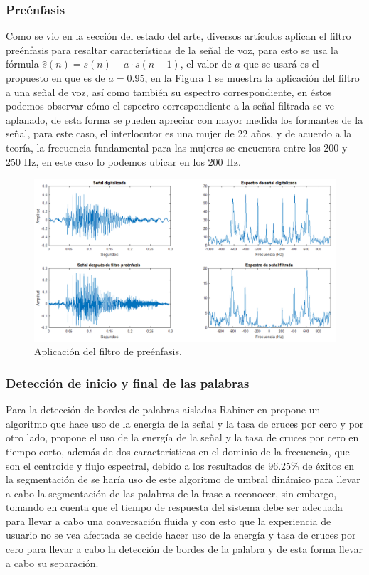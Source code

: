 	\subsubsection*{Preénfasis}
	
	Como se vio en la sección del estado del arte, diversos artículos aplican el filtro preénfasis para resaltar características de la señal de voz, para esto se usa la fórmula $\hat{s}(n)=s(n)-a\cdot s(n-1)$, el valor de $a$ que se usará es el propuesto en \cite{A6} que es de $a=0.95$, en la Figura \ref{fig:ana:preenfasis} se muestra la aplicación del filtro a una señal de voz, así como también su espectro correspondiente, en éstos podemos observar cómo el espectro correspondiente a la señal filtrada se ve aplanado, de esta forma se pueden apreciar con mayor medida los formantes de la señal, para este caso, el interlocutor es una mujer de 22 años, y de acuerdo a la teoría, la frecuencia fundamental para las mujeres se encuentra entre los 200 y 250 Hz, en este caso lo podemos ubicar en los 200 Hz.
	
		\begin{figure}[H]
			\centering
			\includegraphics[width=1\linewidth]{figures/preenfasis}
			\caption{Aplicación del filtro de preénfasis.}
			\label{fig:ana:preenfasis}
		\end{figure}
	
	\subsubsection*{Detección de inicio y final de las palabras}
	
	Para la detección de bordes de palabras aisladas Rabiner en \cite{Rabiner1975} propone un algoritmo que hace uso de la energía de la señal y la tasa de cruces por cero y \cite{A31} por otro lado, propone el uso de la energía de la señal y la tasa de cruces por cero en tiempo corto, además de dos características en el dominio de la frecuencia, que son el centroide y flujo espectral, debido a los resultados de 96.25\% de éxitos en la segmentación de \cite{A31} se haría uso de este algoritmo de umbral dinámico para llevar a cabo la segmentación de las palabras de la frase a reconocer, sin embargo, tomando en cuenta que el tiempo de respuesta del sistema debe ser adecuada para llevar a cabo una conversación fluida y con esto que la experiencia de usuario no se vea afectada se decide hacer uso de la energía y tasa de cruces por cero para llevar a cabo la detección de bordes de la palabra y de esta forma llevar a cabo su separación. 
	
